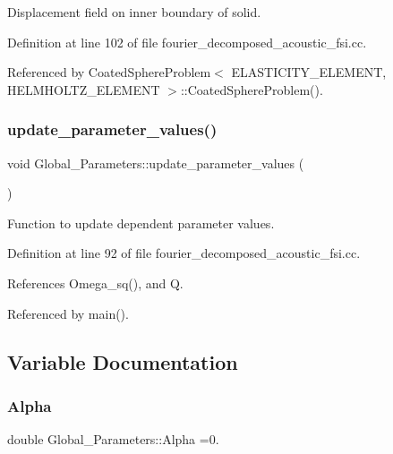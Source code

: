 Displacement field on inner boundary of solid. 



Definition at line 102 of file fourier\+\_\+decomposed\+\_\+acoustic\+\_\+fsi.\+cc.



Referenced by Coated\+Sphere\+Problem$<$ E\+L\+A\+S\+T\+I\+C\+I\+T\+Y\+\_\+\+E\+L\+E\+M\+E\+N\+T, H\+E\+L\+M\+H\+O\+L\+T\+Z\+\_\+\+E\+L\+E\+M\+E\+N\+T $>$\+::\+Coated\+Sphere\+Problem().

\mbox{\label{namespaceGlobal__Parameters_ae0f9a80fb7510dbfbbef22582da231b7}} 
\subsubsection{\texorpdfstring{update\+\_\+parameter\+\_\+values()}{update\_parameter\_values()}}
{\footnotesize\ttfamily void Global\+\_\+\+Parameters\+::update\+\_\+parameter\+\_\+values (\begin{DoxyParamCaption}{ }\end{DoxyParamCaption})}



Function to update dependent parameter values. 



Definition at line 92 of file fourier\+\_\+decomposed\+\_\+acoustic\+\_\+fsi.\+cc.



References Omega\+\_\+sq(), and Q.



Referenced by main().



\subsection{Variable Documentation}
\mbox{\label{namespaceGlobal__Parameters_afbe27ad463a1fb23cb99d029a9fac731}} 
\subsubsection{\texorpdfstring{Alpha}{Alpha}}
{\footnotesize\ttfamily double Global\+\_\+\+Parameters\+::\+Alpha =0.}



